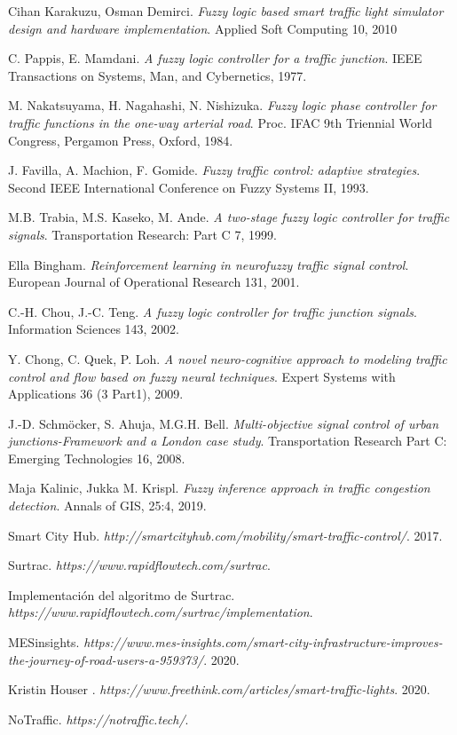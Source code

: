 \begin{thebibliography}{1}
	Cihan Karakuzu, Osman Demirci.
	\textit{Fuzzy logic based smart traffic light simulator design and hardware	implementation}. 
	Applied Soft Computing 10, 2010
	
	C. Pappis, E. Mamdani. 
	\textit{A fuzzy logic controller for a traffic junction}. 
	 IEEE Transactions on Systems, Man, and Cybernetics, 1977.
	
	M. Nakatsuyama, H. Nagahashi, N. Nishizuka. 
	\textit{Fuzzy logic phase controller for traffic functions in the one-way arterial road}. 
	Proc. IFAC 9th Triennial World
	Congress, Pergamon Press, Oxford, 1984.
	
	J. Favilla, A. Machion, F. Gomide. 
	\textit{Fuzzy traffic control: adaptive strategies}. 
	Second IEEE International Conference on Fuzzy Systems II, 1993.
		
	M.B. Trabia, M.S. Kaseko, M. Ande. 
	\textit{A two-stage fuzzy logic controller for traffic signals}. 
	Transportation Research: Part C 7, 1999.
	
	Ella Bingham. 
	\textit{Reinforcement learning in neurofuzzy traffic signal control}. 
	European Journal of Operational Research 131, 2001.
	
	C.-H. Chou, J.-C. Teng. 
	\textit{A fuzzy logic controller for traffic junction signals}. 
	Information Sciences 143, 2002.
	
	Y. Chong, C. Quek, P. Loh. 
	\textit{A novel neuro-cognitive approach to modeling traffic control and flow based on fuzzy neural techniques}. 
	Expert Systems with Applications 36 (3 Part1), 2009.
	
	J.-D. Schmöcker, S. Ahuja, M.G.H. Bell. 
	\textit{Multi-objective signal control of urban	junctions-Framework and a London case study}. 
	Transportation Research Part C:	Emerging Technologies 16, 2008.

	Maja Kalinic, Jukka M. Krispl. 
	\textit{Fuzzy inference approach in traffic congestion detection}. 
	Annals of GIS, 25:4, 2019.	
	
	Smart City Hub.
	\textit{http://smartcityhub.com/mobility/smart-traffic-control/}. 
	2017.	
		
	Surtrac.
	\textit{https://www.rapidflowtech.com/surtrac}.
			
	Implementación del algoritmo de Surtrac.
	\textit{https://www.rapidflowtech.com/surtrac/implementation}. 
	
	MESinsights.
	\textit{https://www.mes-insights.com/smart-city-infrastructure-improves-the-journey-of-road-users-a-959373/}. 2020.
	
	Kristin Houser .
	\textit{https://www.freethink.com/articles/smart-traffic-lights}. 2020.
	
	NoTraffic.
	\textit{https://notraffic.tech/}.
	
	
\end{thebibliography}















